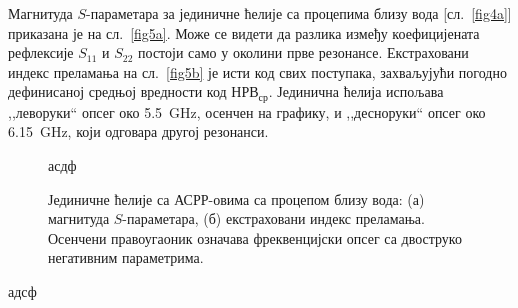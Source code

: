 Магнитуда $S$-параметара за јединичне ћелије са процепима близу вода [сл.~\ref{fig4a}] приказана је на сл.~\ref{fig5a}. Може се видети да разлика између коефицијената рефлексије $S_{11}$ и $S_{22}$ постоји само у околини прве резонансе. Екстраховани индекс преламања на сл.~\ref{fig5b} је исти код свих поступака, захваљујући погодно дефинисаној средњој вредности код $НРВ_{ср}$. Јединична ћелија испољава ,,леворуки`` опсег око \SI{5.5}{\giga\hertz}, осенчен на графику, и ,,десноруки`` опсег око \SI{6.15}{\giga\hertz}, који одговара другој резонанси.
\begin{figure}[!t]
\hfill
{}
\caption{Јединичне ћелије са АСРР-овима са процепом близу вода: (а) магнитуда $S$-параметара, (б) екстраховани индекс преламања. Осенчени правоугаоник означава фреквенцијски опсег са двоструко негативним параметрима.}
\label{fig5}асдф
\end{figure}адсф 

